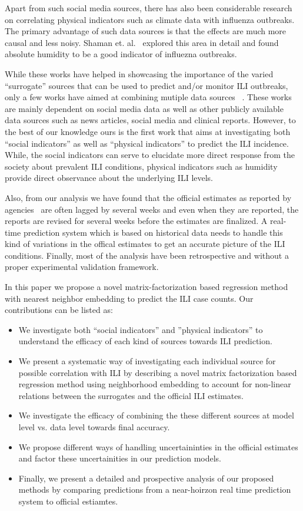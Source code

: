 Apart from such social media sources,
there has also been considerable research on 
correlating physical indicators such as climate data with influenza outbreaks. 
The primary advantage of such data sources is that the
effects are much more causal and less noisy. 
Shaman et. al.~\cite{ref9, Shaman_orig_humidity_link, Shaman_humidity_USA} 
explored this area in detail and found absolute humidity 
to be a good indicator of influezna outbreaks.

While these works have helped in showcasing the importance of the varied 
``surrogate'' sources that can be used to predict and/or monitor ILI outbreaks, 
only a few works have aimed at combining mutiple data sources 
~\cite{ref10, ref3}.  These works are mainly dependent on social
media data as well as other publicly available data sources such as news 
articles, social media and clinical reports. However, to the best of our knowledge 
ours is the first work that aims at investigating both ``social indicators'' as well 
as ``physical indicators'' to predict the ILI incidence. While, the social indicators
can serve to elucidate more direct response from the society about prevalent ILI 
conditions, physical indicators such as humidity provide direct observance about 
the underlying ILI levels. 

Also, from our analysis we have found that the official estimates as reported by
agencies~\cite{PAHO:2013} are often lagged by several weeks and even when they
are reported, the reports are revised for several weeks before the estimates 
are finalized. A real-time prediction system which is based on historical data
needs to handle this kind of variations in the offical estimates to get an 
accurate picture of the ILI conditions. Finally, most of the analysis have been 
retrospective and without a proper experimental validation framework.

In this paper we propose a novel matrix-factorization based regression method with 
nearest neighbor embedding to predict the ILI case counts. Our contributions can be listed
as:
\begin{itemize}
  \item We investigate both ``social indicators'' and ''physical indicators'' to 
    understand the efficacy of each kind of sources towards ILI prediction.
  \item We present a systematic way of investigating each individual source for possible 
    correlation with ILI by describing a novel matrix factorization based regression method
    using neighborhood embedding to account for 
    non-linear relations between the surrogates and the official ILI estimates.
  \item We investigate the efficacy of combining the these different sources at model 
    level vs. data level towards final accuracy.
  \item We propose different ways of handling uncertaininties in the official 
    estimates and factor these uncertainities in our prediction models.
  \item Finally, we present a detailed and prospective analysis of our proposed methods
    by comparing predictions from a near-hoirzon real time prediction system to 
    official estiamtes.
\end{itemize}

